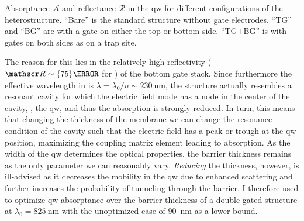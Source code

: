 \begin{margintable}
    \centering
    \footnotesize
    \caption{
        Absorptance $\mathscr{A}$ and reflectance $\mathscr{R}$ in the \gls{qw} for different configurations of the heterostructure.
        \enquote{Bare} is the standard structure without gate electrodes.
        \enquote{TG} and \enquote{BG} are with a gate on either the top or bottom side.
        \enquote{TG+BG} is with gates on both sides as on a trap site.
    }
    \label{tab:exp:tmm:absorptance_reflectance}
    
\end{margintable}

The reason for this lies in the relatively high reflectivity ($\reflectance\sim\qty{75}{\percent}$ for ) of the bottom gate stack.
Since furthermore the effective wavelength in  is $\lambda = \lambda_0/n\sim\qty{230}{\nano\meter}$, the structure actually resembles a resonant cavity for which the electric field mode has a node in the center of the cavity, \ie, the \gls{qw}, and thus the absorption is strongly reduced.
In turn, this means that changing the thickness of the membrane we can change the resonance condition of the cavity such that the electric field has a peak or trough at the \gls{qw} position, maximizing the coupling matrix element leading to absorption.
As the width of the \gls{qw} determines the optical properties, the  barrier thickness remains as the only parameter we can reasonably vary.
\emph{Reducing} the thickness, however, is ill-advised as it decreases the mobility in the \gls{qw} due to enhanced scattering and further increases the probability of tunneling through the barrier.
I therefore used \pymoosh to optimize \gls{qw} absorptance over the barrier thickness of a double-gated structure at $\lambda_0 = \qty{825}{\nano\meter}$ with the unoptimized case of \qty{90}{\nano\meter} as a lower bound.

